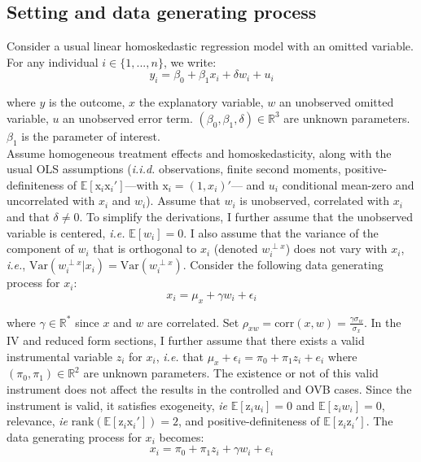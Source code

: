\documentclass[usletter, 12pt]{article}
\begin{document}
		\subsection{Setting and data generating process}\label{maths_dgp}
		
			Consider a usual linear homoskedastic regression model with an omitted variable. For any individual $i \in \{1, ..., n\}$, we write:
				~
				\begin{equation}\label{maths_dgp_y}
					y_i = \beta_{0} + \beta_{1}x_{i} + \delta w_{i} + u_i
				\end{equation}
				
				where $y$ is the outcome, $x$ the explanatory variable,  $w$ an unobserved omitted variable, $u$ an unobserved error term.  $(\beta_0, \beta_1, \delta) \in \mathbb{R}^{3}$ are unknown parameters. $\beta_1$ is the parameter of interest.\\
			
			Assume homogeneous treatment effects and homoskedasticity, along with the usual OLS assumptions (\textit{i.i.d.} observations, finite second moments, positive-definiteness of $\mathbb{E}[\text{x}_i \text{x}_i']$---with $\text{x}_i = (1, x_i)'$--- and $u_{i}$ conditional mean-zero and uncorrelated with $x_i$ and $w_i$). Assume that $w_{i}$ is unobserved, correlated with $x_{i}$ and that $\delta \neq 0$. To simplify the derivations, I further assume that the unobserved variable is centered, \textit{i.e.} $\mathbb{E}[w_i] = 0$. I also assume that the variance of the component of $w_{i}$ that is orthogonal to $x_{i}$ (denoted $w_{i}^{\perp x}$) does not vary with $x_{i}$, \textit{i.e.}, $\text{Var}(w_{i}^{\perp x}|x_{i}) = \text{Var}(w_{i}^{\perp x})$. Consider the following data generating process for $x_i$:
				~
				\begin{equation}\label{maths_dgp_x}
					x_i = \mu_{x} + \gamma w_{i} + \epsilon_i
				\end{equation}
				
				where $\gamma \in \mathbb{R}^{*}$ since $x$ and $w$ are correlated. Set $\rho_{xw} = \text{corr}(x, w) =  \frac{\gamma \sigma_{w}}{\sigma_{x}}$. In the IV and reduced form sections, I further assume that there exists a valid instrumental variable $z_i$ for $x_i$, \textit{i.e.} that $\mu_x + \epsilon_{i} = \pi_0 + \pi_1 z_i + e_{i}$  where $(\pi_0, \pi_1) \in \mathbb{R}^{2}$ are unknown parameters. The existence or not of this valid instrument does not affect the results in the controlled and \textsc{OVB} cases. Since the instrument is valid, it satisfies exogeneity, \textit{ie} $\mathbb{E}[\text{z}_{i}u_{i}] = 0$ and  $\mathbb{E}[z_{i}w_{i}] = 0$, relevance, \textit{ie} $\text{rank}(\mathbb{E}[\text{z}_{i}\text{x}_i']) = 2$,  and positive-definiteness of $\mathbb{E}[\text{z}_i \text{z}_i']$. The data generating process for $x_i$ becomes:			
				~
				\begin{equation}\label{maths_dgp_x_iv}
					x_i = \pi_0 + \pi_1 z_i + \gamma w_{i} + e_{i}
				\end{equation}
				
\end{document}
